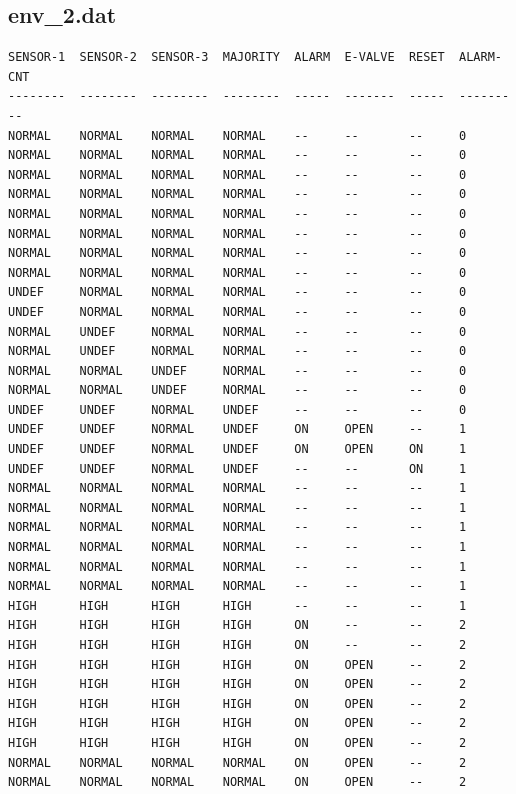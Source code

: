 \documentclass[a4paper, titlepage]{article}
\begin{document}
\subsection{env\_2.dat}
{\small
\begin{lstlisting}
SENSOR-1  SENSOR-2  SENSOR-3  MAJORITY  ALARM  E-VALVE  RESET  ALARM-CNT
--------  --------  --------  --------  -----  -------  -----  ---------
NORMAL    NORMAL    NORMAL    NORMAL    --     --       --     0
NORMAL    NORMAL    NORMAL    NORMAL    --     --       --     0
NORMAL    NORMAL    NORMAL    NORMAL    --     --       --     0
NORMAL    NORMAL    NORMAL    NORMAL    --     --       --     0
NORMAL    NORMAL    NORMAL    NORMAL    --     --       --     0
NORMAL    NORMAL    NORMAL    NORMAL    --     --       --     0
NORMAL    NORMAL    NORMAL    NORMAL    --     --       --     0
NORMAL    NORMAL    NORMAL    NORMAL    --     --       --     0
UNDEF     NORMAL    NORMAL    NORMAL    --     --       --     0
UNDEF     NORMAL    NORMAL    NORMAL    --     --       --     0
NORMAL    UNDEF     NORMAL    NORMAL    --     --       --     0
NORMAL    UNDEF     NORMAL    NORMAL    --     --       --     0
NORMAL    NORMAL    UNDEF     NORMAL    --     --       --     0
NORMAL    NORMAL    UNDEF     NORMAL    --     --       --     0
UNDEF     UNDEF     NORMAL    UNDEF     --     --       --     0
UNDEF     UNDEF     NORMAL    UNDEF     ON     OPEN     --     1
UNDEF     UNDEF     NORMAL    UNDEF     ON     OPEN     ON     1
UNDEF     UNDEF     NORMAL    UNDEF     --     --       ON     1
NORMAL    NORMAL    NORMAL    NORMAL    --     --       --     1
NORMAL    NORMAL    NORMAL    NORMAL    --     --       --     1
NORMAL    NORMAL    NORMAL    NORMAL    --     --       --     1
NORMAL    NORMAL    NORMAL    NORMAL    --     --       --     1
NORMAL    NORMAL    NORMAL    NORMAL    --     --       --     1
NORMAL    NORMAL    NORMAL    NORMAL    --     --       --     1
HIGH      HIGH      HIGH      HIGH      --     --       --     1
HIGH      HIGH      HIGH      HIGH      ON     --       --     2
HIGH      HIGH      HIGH      HIGH      ON     --       --     2
HIGH      HIGH      HIGH      HIGH      ON     OPEN     --     2
HIGH      HIGH      HIGH      HIGH      ON     OPEN     --     2
HIGH      HIGH      HIGH      HIGH      ON     OPEN     --     2
HIGH      HIGH      HIGH      HIGH      ON     OPEN     --     2
HIGH      HIGH      HIGH      HIGH      ON     OPEN     --     2
NORMAL    NORMAL    NORMAL    NORMAL    ON     OPEN     --     2
NORMAL    NORMAL    NORMAL    NORMAL    ON     OPEN     --     2

\end{lstlisting}}
\end{document}
